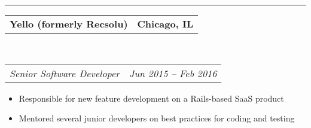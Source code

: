 \documentclass[10pt,letterpaper]{article}
\makeatletter
\newcommand{\headerrow}[2]
{\begin{tabular*}{\linewidth}{l@{\extracolsep{\fill}}r}
  #1 &
  #2 \\
\end{tabular*}}
\newenvironment{indentsection}[1]%
{\begin{list}{}%
  {\setlength{\leftmargin}{#1}}%
  \item[]%
}
{\end{list}}
\makeatother
\begin{document}
\hrule
\begin{indentsection}{\parindent}
  \headerrow
    {\textbf{Yello (formerly Recsolu)} }
    {\textbf{Chicago, IL}}
  \\
  \headerrow
    {\emph{Senior Software Developer}}
    {\emph{Jun 2015 -- Feb 2016}}

  \begin{itemize}
  \renewcommand{\labelitemi}{$-$}
  \vspace{-0.1in}
    \item Responsible for new feature development on a Rails-based SaaS product
    \item Mentored several junior developers on best practices for coding and testing
  \end{itemize}
\end{indentsection}
\end{document}
